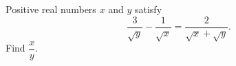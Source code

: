 Positive real numbers $x$ and $y$ satisfy
\[
\dfrac{3}{\sqrt y}-\dfrac{1}{\sqrt x}=\dfrac{2}{\sqrt x+\sqrt y}.
\]
Find $\dfrac{x}{y}$.

